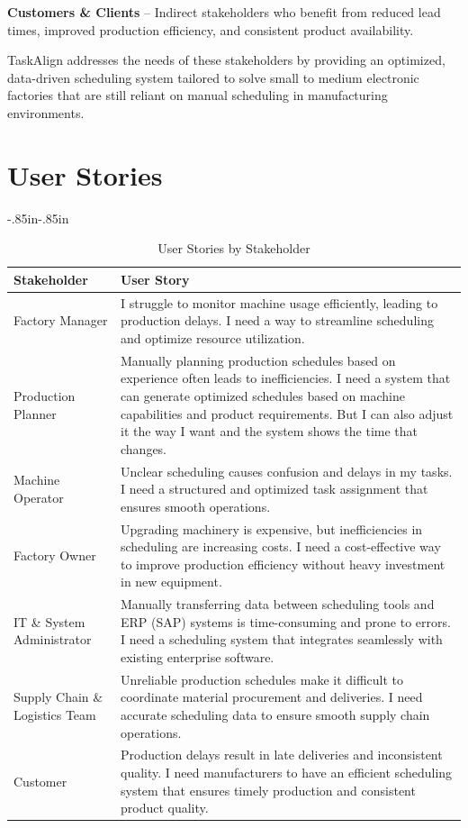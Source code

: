 \textbf{Customers \& Clients} – Indirect stakeholders who benefit from reduced lead times, improved production efficiency, and consistent product availability.

TaskAlign addresses the needs of these stakeholders by providing an optimized, data-driven scheduling system tailored to solve small to medium electronic factories that are still reliant on manual scheduling in manufacturing environments.


\section{User Stories}
\label{section:user-stories}


\begin{table}[!h]
    \begin{adjustwidth}{-.85in}{-.85in}
        \noindent
        \centering
        \small\begin{tabularx}{1.3\textwidth}{|>{\columncolor{yellow!20}\raggedright\arraybackslash}p{2.5cm}|X|}
            \hline
            \textbf{Stakeholder} & \textbf{User Story} \\\hline
            Factory Manager & I struggle to monitor machine usage efficiently, leading to production delays. I need a way to streamline scheduling and optimize resource utilization. \\\hline
            Production Planner & Manually planning production schedules based on experience often leads to inefficiencies. I need a system that can generate optimized schedules based on machine capabilities and product requirements. But I can also adjust it the way I want and the system shows the time that changes. \\\hline
            Machine Operator & Unclear scheduling causes confusion and delays in my tasks. I need a structured and optimized task assignment that ensures smooth operations. \\\hline
            Factory Owner & Upgrading machinery is expensive, but inefficiencies in scheduling are increasing costs. I need a cost-effective way to improve production efficiency without heavy investment in new equipment. \\\hline
            IT \& System Administrator & Manually transferring data between scheduling tools and ERP (SAP) systems is time-consuming and prone to errors. I need a scheduling system that integrates seamlessly with existing enterprise software. \\\hline
            Supply Chain \& Logistics Team & Unreliable production schedules make it difficult to coordinate material procurement and deliveries. I need accurate scheduling data to ensure smooth supply chain operations. \\\hline
            Customer & Production delays result in late deliveries and inconsistent quality. I need manufacturers to have an efficient scheduling system that ensures timely production and consistent product quality. \\\hline
        \end{tabularx}
    \end{adjustwidth}
    \caption{User Stories by Stakeholder}
\end{table}
